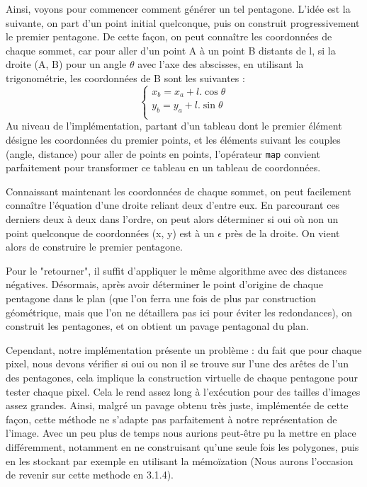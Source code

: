 \documentclass{article}
\begin{document}
\begin{enumerate}
\hspace*{0.5cm}Ainsi, voyons pour commencer comment générer un tel pentagone. L'idée est la suivante, on part d'un point initial quelconque, puis on construit progressivement le premier pentagone. De cette façon, on peut connaître les coordonnées de chaque sommet, car pour aller d'un point A à un point B distants de l, si la droite (A, B) pour un angle $\theta$ avec l'axe des abscisses, en utilisant la trigonométrie, les coordonnées de B sont les suivantes : 
\begin{equation*}
        \left\{\begin{matrix}
        x_b = x_a + l.\cos{\theta} \\
        y_b = y_a + l.\sin{\theta} \\
\end{matrix}\right.
\end{equation*}
\hspace*{0.5cm}Au niveau de l'implémentation, partant d'un tableau dont le premier élément désigne les coordonnées du premier points, et les éléments suivant les couples (angle, distance) pour aller de points en points, l'opérateur \texttt{map} convient parfaitement pour transformer ce tableau en un tableau de coordonnées. 


\hspace*{0.5cm}Connaissant maintenant les coordonnées de chaque sommet, on peut facilement connaître l'équation d'une droite reliant deux d'entre eux. En parcourant ces derniers deux à deux dans l'ordre, on peut alors déterminer si oui où non un point quelconque de coordonnées (x, y) est à un $\epsilon$ près de la droite. On vient alors de construire le premier pentagone.

\hspace*{0.5cm}Pour le "retourner", il suffit d'appliquer le même algorithme avec des distances négatives. Désormais, après avoir déterminer le point d'origine de chaque pentagone dans le plan (que l'on ferra une fois de plus par construction géométrique, mais que l'on ne détaillera pas ici pour éviter les redondances), on construit les pentagones, et on obtient un pavage pentagonal du plan.

\hspace*{0.5cm} Cependant, notre implémentation présente un problème : du fait que pour chaque pixel, nous devons vérifier si oui ou non il se trouve sur l'une des arêtes de l'un des pentagones, cela implique la construction virtuelle de chaque pentagone pour tester chaque pixel. Cela le rend assez long à l'exécution pour des tailles d'images assez grandes. Ainsi, malgré un pavage obtenu très juste, implémentée de cette façon, cette méthode ne s'adapte pas parfaitement à notre représentation de l'image. Avec un peu plus de temps nous aurions peut-être pu la mettre en place différemment, notamment en ne construisant qu'une seule fois les polygones, puis en les stockant par exemple en utilisant la mémoïzation (Nous aurons l'occasion de revenir sur cette methode en 3.1.4).

\end{enumerate}
\end{document}
